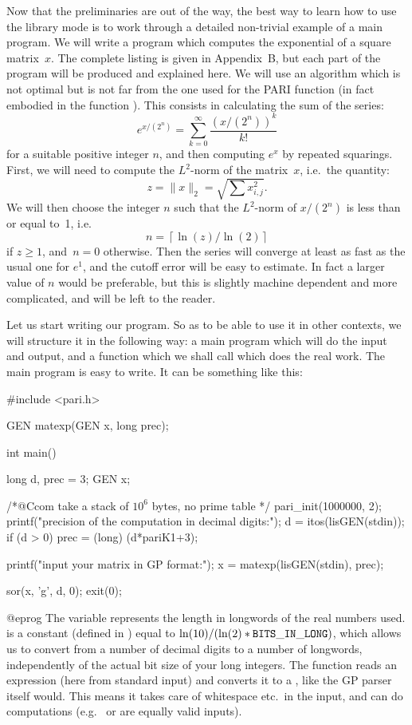 \noindent
Now that the preliminaries are out of the way, the best way to learn how to
use the library mode is to work through a detailed non-trivial example of a
main program. We will write a program which computes the exponential of a
square matrix~$x$.  The complete listing is given in Appendix~B, but each
part of the program will be produced and explained here. We will use an
algorithm which is not optimal but is not far from the one used for the PARI
function  (in fact embodied in the function ). This
consists in calculating the sum of the series:
$$e^{x/(2^n)}=\sum_{k=0}^\infty \dfrac{(x/(2^n))^k}{k!}$$
for a suitable positive integer $n$, and then computing $e^x$ by repeated
squarings.  First, we will need to compute the $L^2$-norm of the matrix~$x$,
i.e.~the quantity:
$$z=\|x\|_2=\sqrt{\sum x_{i,j}^2}.$$
We will then choose the integer $n$ such that the $L^2$-norm of $x/(2^n)$ is
less than or equal to~1, i.e.
$$ n = \left\lceil{\ln(z)}\big/{\ln(2)}\right\rceil $$
if $z\ge1$, and~$n=0$ otherwise. Then the series will converge at least as
fast as the usual one for $e^1$, and the cutoff error will be easy to
estimate. In fact a larger value of $n$ would be preferable, but this is
slightly machine dependent and more complicated, and will be left to the
reader.

Let us start writing our program. So as to be able to use it in other
contexts, we will structure it in the following way: a main program which
will do the input and output, and a function which we shall call 
which does the real work. The main program is easy to write. It can be
something like this:

\bprog
#include <pari.h>

GEN matexp(GEN x, long prec);

int
main()
{
  long d, prec = 3;
  GEN x;

  /*@Ccom take a stack of $10^6$ bytes, no prime table */
  pari_init(1000000, 2);
  printf("precision of the computation in decimal digits:\n");
  d = itos(lisGEN(stdin));
  if (d > 0) prec = (long) (d*pariK1+3);

  printf("input your matrix in GP format:\n");
  x = matexp(lisGEN(stdin), prec);

  sor(x, 'g', d, 0);
  exit(0);
}@eprog
\noindent
The variable  represents the length in longwords of the real
numbers used.  is a constant (defined in ) equal
to $\ln(10) / (\ln(2) * {\tt BITS\_IN\_LONG})$, which allows us to convert
from a number of decimal digits to a number of longwords, independently of
the actual bit size of your long integers. The function  reads an
expression (here from standard input) and converts it to a , like
the GP parser itself would. This means it takes care of whitespace etc.\ in
the input, and can do computations (e.g.~ or \kbd{[1,0; 0,1]}
are equally valid inputs).

